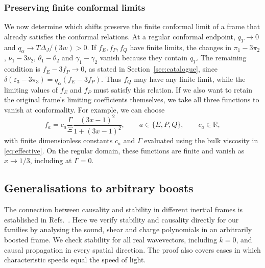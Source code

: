 \subsubsection*{Preserving finite conformal limits}
We now determine which shifts preserve the finite conformal limit of a
frame that already satisfies the conformal relations.
At a regular conformal endpoint, $q_T\to0$ and
$q_\alpha\to T\Delta_J/(3w)>0$. If $f_E,f_P,f_Q$ have finite limits,
the changes in $\pi_1-3\pi_2$, $\nu_1-3\nu_2$,
$\theta_1-\theta_2$ and $\gamma_1-\gamma_2$ vanish because they contain
$q_T$. The remaining condition is $f_E-3f_P\to0$, as stated in
Section~\ref{sec:catalogue}, since
$\delta(\varepsilon_3-3\pi_3)=q_\alpha(f_E-3f_P)$.
Thus $f_Q$ may have any finite limit, while the limiting values of
$f_E$ and $f_P$ must satisfy this relation. If we also want to retain the original frame's limiting coefficients
themselves, we take all three functions to vanish at conformality.
For example, we can choose
\begin{equation}\label{app:eq:hierarchy-explicit-deformation}
 f_a=c_a\frac{\Gamma}{\Xi}
       \frac{(3x-1)^2}{1+(3x-1)^2},\qquad
 a\in\{E,P,Q\},\qquad c_a\in\mathbb R,
\end{equation}
with finite dimensionless constants $c_a$ and $\Gamma$ evaluated using
the bulk viscosity in \eqref{eq:effective}. On the regular
domain, these functions are finite and vanish as $x\to1/3$, including
at $\Gamma=0$. 


\subsection{Generalisations to arbitrary boosts}\label{app:arbitrary-boosts}
The connection between causality and stability in different inertial
frames is established in Refs.~\cite{GavassinoBoosts,WangPu,BDN2022}.
Here we verify stability and causality directly for our families by
analysing the sound, shear and charge polynomials in an arbitrarily
boosted frame. We check stability for all real wavevectors, including
$k=0$, and causal propagation in every spatial direction. The proof
also covers cases in which characteristic speeds equal the speed of
light.

